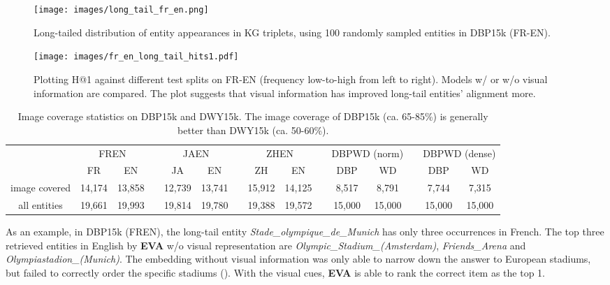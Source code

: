 \documentclass[letterpaper]{article} \usepackage{aaai21}  \usepackage{times}  \usepackage{helvet} \usepackage{courier}  \usepackage[hyphens]{url}  \usepackage{graphicx} \urlstyle{rm} \def\UrlFont{\rm}  \usepackage{natbib}  \usepackage{caption} \frenchspacing  \setlength{\pdfpagewidth}{8.5in}  \setlength{\pdfpageheight}{11in}
\newcommand{\modelname}[0]{\textbf{\textsc{EVA}}\xspace}
\begin{document}
\begin{figure}[!t]
\centering
\small
\texttt{[image: images/long\_tail\_fr\_en.png]}
\caption{\small{Long-tailed distribution of entity appearances in KG triplets, using 100 randomly sampled entities in DBP15k (FR-EN).}}
 \label{fig:long_tail}
\end{figure}
 

\begin{figure}[!t]
\centering

\texttt{[image: images/fr\_en\_long\_tail\_hits1.pdf]}
\caption{\small{Plotting H@1 against different test splits on FR-EN (frequency low-to-high from left to right). Models w/ or w/o visual information are compared. The plot suggests that visual information has improved long-tail entities' alignment more.}}
\label{fig:long_tail_five_splits}
\end{figure}

 \begin{table*}[!ht] \small
\setlength{\tabcolsep}{4pt}
\renewcommand{\arraystretch}{0.9}
\caption{\small Image coverage statistics on DBP15k and DWY15k. The image coverage of DBP15k (ca. 65-85\%) is generally better than DWY15k (ca. 50-60\%).}
\label{Table:image_coverage_stat}
\centering
\begin{tabular}{ccccccccccccccc}
\toprule
  \multirow{2}{*}{} &  \multicolumn{2}{c}{FREN} & & \multicolumn{2}{c}{JAEN} & & \multicolumn{2}{c}{ZHEN} & & \multicolumn{2}{c}{DBPWD (norm)} & & \multicolumn{2}{c}{DBPWD (dense)}\\
 \cmidrule{2-3}\cmidrule{5-6}\cmidrule{8-9}\cmidrule{11-12} \cmidrule{14-15} 
  & FR & EN & & JA & EN & & ZH & EN & &  DBP & WD && DBP & WD \\
  \midrule 
 image covered & 14,174 & 13,858 & & 12,739 & 13,741 & & 15,912 & 14,125 & & 8,517 & 8,791 & & 7,744 & 7,315\\
 all entities & 19,661 & 19,993 & & 19,814 & 19,780 & & 19,388 & 19,572 & & 15,000 & 15,000 & & 15,000 & 15,000 \\
\bottomrule
\end{tabular}
\end{table*}

As an example, in DBP15k (FREN), the long-tail entity \emph{Stade\_olympique\_de\_Munich} has only three occurrences in French. The top three retrieved entities in English by \modelname w/o visual representation are \emph{Olympic\_Stadium\_(Amsterdam)}, \emph{Friends\_Arena} and \emph{Olympiastadion\_(Munich)}. The embedding without visual information was only able to narrow down the answer to European stadiums, but failed to correctly order the specific stadiums ().
With the visual cues, \modelname is able to rank the correct item as the top 1.
\end{document}
